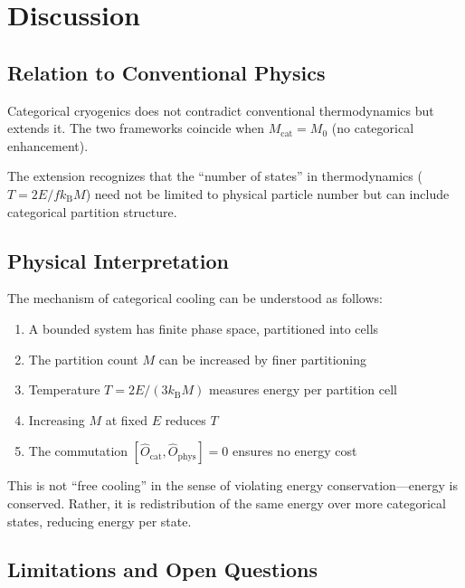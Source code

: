 \documentclass[twocolumn,10pt,twoside]{article}
\newcommand{\kb}{k_{\mathrm{B}}}
\newcommand{\Ocat}{\hat{O}_{\mathrm{cat}}}
\newcommand{\Ophys}{\hat{O}_{\mathrm{phys}}}
\newcommand{\Mcat}{M_{\mathrm{cat}}}
\begin{document}
\section{Discussion}

\subsection{Relation to Conventional Physics}

Categorical cryogenics does not contradict conventional thermodynamics but extends it. The two frameworks coincide when $\Mcat = M_0$ (no categorical enhancement).

The extension recognizes that the ``number of states'' in thermodynamics ($T = 2E/f\kb M$) need not be limited to physical particle number but can include categorical partition structure.

\subsection{Physical Interpretation}

The mechanism of categorical cooling can be understood as follows:

\begin{enumerate}
    \item A bounded system has finite phase space, partitioned into cells
    \item The partition count $M$ can be increased by finer partitioning
    \item Temperature $T = 2E/(3\kb M)$ measures energy per partition cell
    \item Increasing $M$ at fixed $E$ reduces $T$
    \item The commutation $[\Ocat, \Ophys] = 0$ ensures no energy cost
\end{enumerate}

This is not ``free cooling'' in the sense of violating energy conservation---energy is conserved. Rather, it is redistribution of the same energy over more categorical states, reducing energy per state.

\subsection{Limitations and Open Questions}
\end{document}
